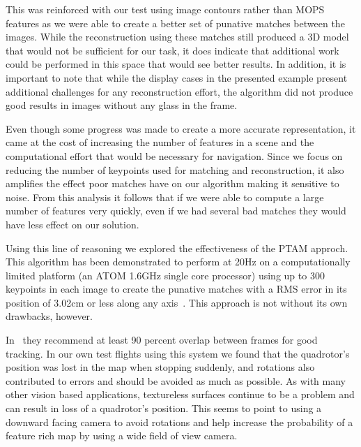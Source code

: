 \documentclass{acmsiggraph}
\begin{document}
This was reinforced with our test using image contours rather than MOPS features as we were able to create a better set of
punative matches between the images.  While the reconstruction using these matches still produced a 3D model that would not
be sufficient for our task, it does indicate that additional work could be performed in this space that would see better
results.  In addition, it is important to note that while the display cases in the presented example present additional
challenges for any reconstruction effort, the algorithm did not produce good results in images without any glass in the 
frame.  

Even though some progress was made to create a more accurate representation, it came at the cost of increasing the
number of features in a scene and the computational effort that would be necessary for navigation.  Since we focus on 
reducing the number of keypoints used for matching and reconstruction, it also amplifies the effect poor matches have on
our algorithm making it sensitive to noise.  From this analysis it follows that if we were able to compute a large number of
features very quickly, even if we had several bad matches they would have less effect on our solution.

Using this line of reasoning we explored the effectiveness of the PTAM approch.  This algorithm has been demonstrated to
perform at 20Hz on a computationally limited platform (an ATOM 1.6GHz single core processor) using up to 300 keypoints in each
image to create the punative matches with a RMS error in its position of 3.02cm or less along any axis~\cite{weiss2011}. This
approach is not without its own drawbacks, however.

In~\cite{weiss2011} they recommend at least 90 percent overlap between frames for good tracking. In our own test flights 
using this system we found that the quadrotor's position was lost in the map when stopping suddenly, and rotations also 
contributed to errors and should be avoided as much as possible.  As with many other vision based applications, textureless 
surfaces continue to be a problem and can result in loss of a quadrotor's position.  This seems to point to using a downward 
facing camera to avoid rotations and help increase the probability of a feature rich map by using a wide field of view camera.
\end{document}
